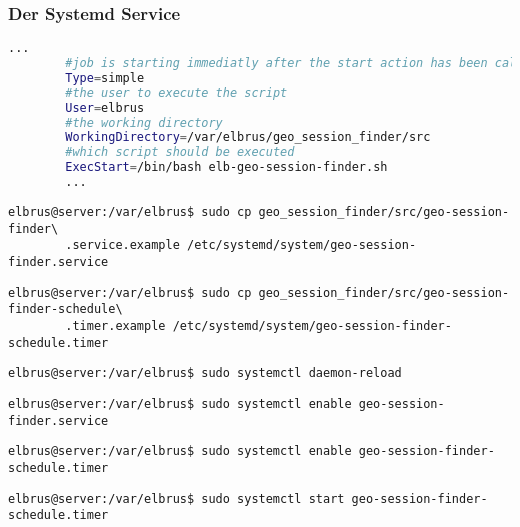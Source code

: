 	\subsubsection[systemd service]{Der Systemd Service}
	
	\lstset{style=files}
	\begin{lstlisting}[caption={geo-session-finder.service.example - Die Variable 'WorkingDirectory' sowie die Variable 'User' anpassen.},language=bash ,keywords={WorkingDirectory, User}, keywordstyle=\color{red}, firstnumber=5]
		...
		#job is starting immediatly after the start action has been called
		Type=simple
		#the user to execute the script
		User=elbrus
		#the working directory
		WorkingDirectory=/var/elbrus/geo_session_finder/src
		#which script should be executed
		ExecStart=/bin/bash elb-geo-session-finder.sh
		...
	\end{lstlisting}
	
	\lstset{style=commands}
	\begin{lstlisting}[caption={Kopieren des Serviceprogrammes.}]
		elbrus@server:/var/elbrus$ sudo cp geo_session_finder/src/geo-session-finder\
		.service.example /etc/systemd/system/geo-session-finder.service
	\end{lstlisting}
	
	\lstset{style=commands}
	\begin{lstlisting}[caption={Kopieren des Zeitplanungsprogrammes.}]
		elbrus@server:/var/elbrus$ sudo cp geo_session_finder/src/geo-session-finder-schedule\
		.timer.example /etc/systemd/system/geo-session-finder-schedule.timer
	\end{lstlisting}
	
	\lstset{style=commands}
	\begin{lstlisting}[caption={Neuladen des 'systemctl' Deamons.}]
		elbrus@server:/var/elbrus$ sudo systemctl daemon-reload
	\end{lstlisting}
	
	\lstset{style=commands}
	\begin{lstlisting}[caption={Aktivieren des Serviceprogrammes.}]
		elbrus@server:/var/elbrus$ sudo systemctl enable geo-session-finder.service
	\end{lstlisting}
	
	\lstset{style=commands}
	\begin{lstlisting}[caption={Aktivieren des Zeitplanungsprogrammes.}]
		elbrus@server:/var/elbrus$ sudo systemctl enable geo-session-finder-schedule.timer
	\end{lstlisting}
	
	\lstset{style=commands}
	\begin{lstlisting}[caption={Starten des Zeitplanungsprogrammes.}]
		elbrus@server:/var/elbrus$ sudo systemctl start geo-session-finder-schedule.timer
	\end{lstlisting}
